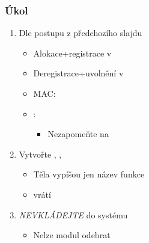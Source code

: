 \begin{frame}
  \frametitle{Úkol}

  \begin{enumerate}
    \item Dle postupu z předchozího slajdu
    \begin{itemize}
      \item Alokace+registrace v 
      \item Deregistrace+uvolnění v 
      \item MAC: 
      \item {}: 
      \begin{itemize}
	\item Nezapomeňte na 
      \end{itemize}
    \end{itemize}

    \item Vytvořte , , 
    \begin{itemize}
      \item Těla vypíšou jen název funkce
      \item {} vrátí 
    \end{itemize}

    \item \emph{NEVKLÁDEJTE} do systému
    \begin{itemize}
      \item Nelze modul odebrat
    \end{itemize}
  \end{enumerate}

\end{frame}

